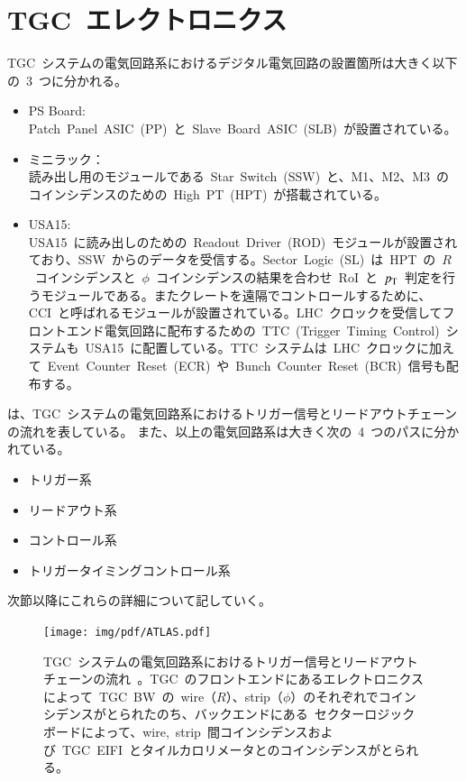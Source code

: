 \section{TGC~エレクトロニクス}
TGC~システムの電気回路系におけるデジタル電気回路の設置箇所は大きく以下の~3~つに分かれる。
\begin{itemize}
    \item PS Board: \\
    Patch~Panel~ASIC~(PP)~と~Slave~Board~ASIC~(SLB)~が設置されている。
    \item ミニラック：\\
    読み出し用のモジュールである~Star~Switch~(SSW)~と、M1、M2、M3~のコインシデンスのための~High~PT~(HPT)~が搭載されている。
    \item USA15: \\
    USA15~に読み出しのための~Readout~Driver~(ROD)~モジュールが設置されており、SSW~からのデータを受信する。Sector~Logic~(SL)~は~HPT~の~$R$~コインシデンスと~$\phi$~コインシデンスの結果を合わせ~RoI~と~$p_{\rm{T}}$~判定を行うモジュールである。またクレートを遠隔でコントロールするために、CCI~と呼ばれるモジュールが設置されている。LHC~クロックを受信してフロントエンド電気回路に配布するための~TTC~(Trigger~Timing~Control)~システムも~USA15~に配置している。TTC~システムは~LHC~クロックに加えて~Event~Counter~Reset~(ECR)~や~Bunch~Counter~Reset~(BCR)~信号も配布する。
\end{itemize}
は、TGC~システムの電気回路系におけるトリガー信号とリードアウトチェーンの流れを表している。
また、以上の電気回路系は大きく次の~4~つのパスに分かれている。
\begin{itemize}
    \item トリガー系
    \item リードアウト系
    \item コントロール系
    \item トリガータイミングコントロール系
\end{itemize}
次節以降にこれらの詳細について記していく。

\begin{figure}[H]
        \centering   
        \texttt{[image: img/pdf/ATLAS.pdf]}
        \caption[TGC システムの電気回路系におけるトリガー信号とリードアウトチェーンの流れ]{TGC~システムの電気回路系におけるトリガー信号とリードアウトチェーンの流れ~\cite{TR:01}。TGC~のフロントエンドにあるエレクトロニクスによって~TGC~BW~の~wire（$R$）、strip（$\phi$）のそれぞれでコインシデンスがとられたのち、バックエンドにある~セクターロジックボードによって、wire,~strip~間コインシデンスおよび~TGC~EIFI~とタイルカロリメータとのコインシデンスがとられる。}
        \label{fig:tgcelec}
\end{figure}

